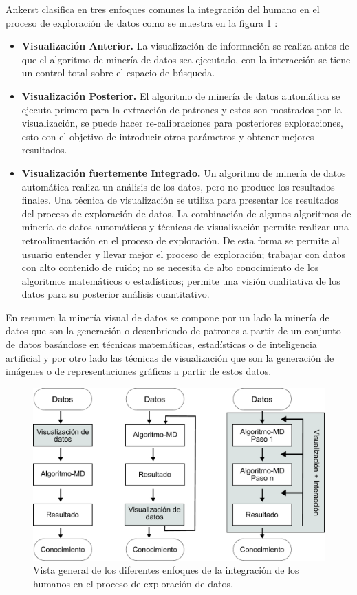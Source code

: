 Ankerst \cite{ankerst2001visual} clasifica en tres enfoques comunes la integración del humano en el proceso de exploración de datos como se muestra en la figura \ref{fig:VDM} :
\begin{itemize}
	\item \textbf{Visualización Anterior.} La visualización de información se realiza antes de que el algoritmo de minería de datos sea ejecutado, con la interacción se tiene un control total sobre el espacio de búsqueda. 
	\item \textbf{Visualización Posterior.} El algoritmo de minería de datos automática se ejecuta primero para la extracción de patrones y estos son mostrados por la visualización, se puede hacer re-calibraciones para posteriores exploraciones, esto con el objetivo de introducir otros parámetros y obtener mejores resultados.
	\item \textbf{Visualización fuertemente Integrado.} Un algoritmo de minería de datos automática realiza un análisis de los datos, pero no produce los resultados finales. Una técnica de visualización se utiliza para presentar los resultados  del proceso de exploración de datos. La combinación de algunos algoritmos de minería de datos automáticos y técnicas de visualización permite  realizar una retroalimentación en el proceso de exploración. De esta forma se permite al usuario entender y llevar mejor el proceso de exploración; trabajar con datos con alto contenido de ruido; no se necesita de alto conocimiento de los algoritmos matemáticos o estadísticos; permite una visión cualitativa de los datos para su posterior análisis cuantitativo.
\end{itemize}

En resumen la minería visual de datos se compone por un lado la minería de datos que son la generación o descubriendo de patrones a partir de un conjunto de datos basándose en técnicas matemáticas, estadísticas o de inteligencia artificial y por otro lado las técnicas de visualización que son la generación de imágenes o de representaciones gráficas a partir de estos datos.
\begin{figure}[!h]
\centering
\includegraphics[width=\columnwidth]{figs/VDM.pdf}%
\caption{Vista general de los diferentes enfoques de la integración de los humanos en el proceso de exploración de datos.}%
\label{fig:VDM}%
\end{figure}

